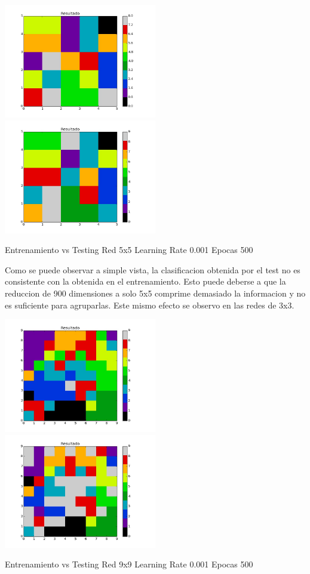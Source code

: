 \includegraphics[width=0.5\textwidth]{img/ej2_train_M_5_lrate_001_epocas_500}
\includegraphics[width=0.5\textwidth]{img/ej2_test_M_5_lrate_001_epocas_500}
{\footnotesize Entrenamiento vs Testing Red 5x5 Learning Rate 0.001 Epocas 500\par}

Como se puede observar a simple vista, la clasificacion obtenida por el test no es consistente con la obtenida en el entrenamiento. Esto puede deberse a que la reduccion de 900 dimensiones a solo 5x5 comprime demasiado la informacion y no es suficiente para agruparlas. Este mismo efecto se observo en las redes de 3x3.

\includegraphics[width=0.5\textwidth]{img/ej2_train_M_9_lrate_001_epocas_500}
\includegraphics[width=0.5\textwidth]{img/ej2_test_M_9_lrate_001_epocas_500}
{\footnotesize Entrenamiento vs Testing Red 9x9 Learning Rate 0.001 Epocas 500\par}

